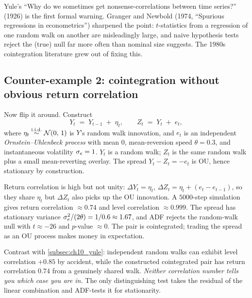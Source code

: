 \begin{historybox}
Yule's ``Why do we sometimes get nonsense-correlations between
time series?'' (1926) is the first formal warning. Granger and
Newbold (1974, ``Spurious regressions in econometrics'')
sharpened the point: $t$-statistics from a regression of one
random walk on another are misleadingly large, and naive
hypothesis tests reject the (true) null far more often than
nominal size suggests. The 1980s cointegration literature grew
out of fixing this.
\end{historybox}

\subsection{Counter-example 2: cointegration without obvious return correlation}
\label{subsec:ch10_cointexample}

Now flip it around. Construct
\begin{equation}
  Y_t \;=\; Y_{t-1} \;+\; \eta_t,
  \qquad
  Z_t \;=\; Y_t \;+\; e_t,
  \label{eq:cointegrated_pair}
\end{equation}
where $\eta_t \overset{\text{i.i.d.}}{\sim} \mathcal{N}(0,\,1)$ is $Y$'s random
walk innovation, and $e_t$ is an independent
\emph{Ornstein--Uhlenbeck process} with mean $0$, mean-reversion
speed $\theta = 0.3$, and instantaneous volatility $\sigma_e = 1$.
$Y_t$ is a random walk; $Z_t$ is the same random walk plus a small
mean-reverting overlay. The spread $Y_t - Z_t = -e_t$ is OU, hence
stationary by construction.

Return correlation is high but not unity:
$\Delta Y_t = \eta_t$, $\Delta Z_t = \eta_t + (e_t - e_{t-1})$, so
they share $\eta_t$ but $\Delta Z_t$ also picks up the OU
innovation. A $5000$-step simulation gives return correlation
$\approx 0.74$ and level correlation $\approx 0.999$. The spread
has stationary variance $\sigma_e^2/(2\theta) = 1/0.6 \approx 1.67$,
and ADF rejects the random-walk null with $t \approx -26$ and
$p$-value $\approx 0$. The pair is cointegrated; trading the
spread as an OU process makes money in expectation.

Contrast with \cref{subsec:ch10_yule}: independent random walks
can exhibit level correlation $+0.85$ by accident, while the
constructed cointegrated pair has return correlation $0.74$ from a
genuinely shared walk. \emph{Neither correlation number tells you
which case you are in.} The only distinguishing test takes the
residual of the linear combination and ADF-tests it for
stationarity.


